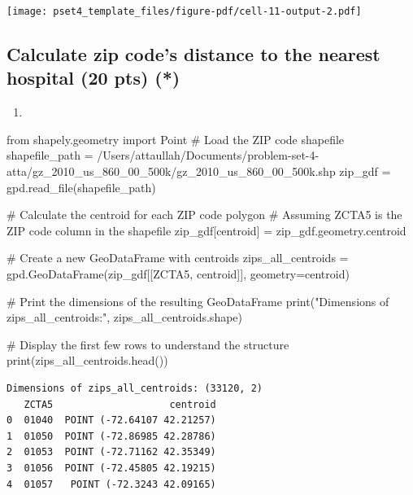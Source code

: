 \documentclass[
  letterpaper,
  DIV=11,
  numbers=noendperiod]{scrartcl}
\newenvironment{Shaded}{\begin{snugshade}}{\end{snugshade}}
\newcommand{\BuiltInTok}[1]{\textcolor[rgb]{0.00,0.23,0.31}{#1}}
\newcommand{\CommentTok}[1]{\textcolor[rgb]{0.37,0.37,0.37}{#1}}
\newcommand{\ImportTok}[1]{\textcolor[rgb]{0.00,0.46,0.62}{#1}}
\newcommand{\NormalTok}[1]{\textcolor[rgb]{0.00,0.23,0.31}{#1}}
\newcommand{\OperatorTok}[1]{\textcolor[rgb]{0.37,0.37,0.37}{#1}}
\newcommand{\StringTok}[1]{\textcolor[rgb]{0.13,0.47,0.30}{#1}}
\providecommand{\tightlist}{%
  \setlength{\itemsep}{0pt}\setlength{\parskip}{0pt}}\usepackage{longtable,booktabs,array}
\begin{document}
\texttt{[image: pset4\_template\_files/figure-pdf/cell-11-output-2.pdf]}

\subsection{Calculate zip code's distance to the nearest hospital (20
pts)
(*)}\label{calculate-zip-codes-distance-to-the-nearest-hospital-20-pts}

\begin{enumerate}
\def\labelenumi{\arabic{enumi}.}
\tightlist
\item
\end{enumerate}

\begin{Shaded}
\begin{Highlighting}[]
\ImportTok{from}\NormalTok{ shapely.geometry }\ImportTok{import}\NormalTok{ Point}
\CommentTok{\# Load the ZIP code shapefile}
\NormalTok{shapefile\_path }\OperatorTok{=} \StringTok{\textquotesingle{}/Users/attaullah/Documents/problem{-}set{-}4{-}atta/gz\_2010\_us\_860\_00\_500k/gz\_2010\_us\_860\_00\_500k.shp\textquotesingle{}}
\NormalTok{zip\_gdf }\OperatorTok{=}\NormalTok{ gpd.read\_file(shapefile\_path)}

\CommentTok{\# Calculate the centroid for each ZIP code polygon}
\CommentTok{\# Assuming \textquotesingle{}ZCTA5\textquotesingle{} is the ZIP code column in the shapefile}
\NormalTok{zip\_gdf[}\StringTok{\textquotesingle{}centroid\textquotesingle{}}\NormalTok{] }\OperatorTok{=}\NormalTok{ zip\_gdf.geometry.centroid}

\CommentTok{\# Create a new GeoDataFrame with centroids}
\NormalTok{zips\_all\_centroids }\OperatorTok{=}\NormalTok{ gpd.GeoDataFrame(zip\_gdf[[}\StringTok{\textquotesingle{}ZCTA5\textquotesingle{}}\NormalTok{, }\StringTok{\textquotesingle{}centroid\textquotesingle{}}\NormalTok{]], geometry}\OperatorTok{=}\StringTok{\textquotesingle{}centroid\textquotesingle{}}\NormalTok{)}

\CommentTok{\# Print the dimensions of the resulting GeoDataFrame}
\BuiltInTok{print}\NormalTok{(}\StringTok{"Dimensions of zips\_all\_centroids:"}\NormalTok{, zips\_all\_centroids.shape)}

\CommentTok{\# Display the first few rows to understand the structure}
\BuiltInTok{print}\NormalTok{(zips\_all\_centroids.head())}
\end{Highlighting}
\end{Shaded}

\begin{verbatim}
Dimensions of zips_all_centroids: (33120, 2)
   ZCTA5                    centroid
0  01040  POINT (-72.64107 42.21257)
1  01050  POINT (-72.86985 42.28786)
2  01053  POINT (-72.71162 42.35349)
3  01056  POINT (-72.45805 42.19215)
4  01057   POINT (-72.3243 42.09165)
\end{verbatim}
\end{document}
